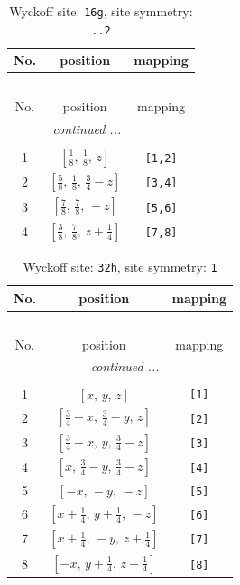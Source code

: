 \documentclass[fleqn,8pt]{jsarticle}
\begin{document}
\renewcommand{\arraystretch}{1.2}
\begin{longtable}{ccc}
\caption{Wyckoff site: {\tt 16g}, site symmetry: {\tt ..2}}
 \\
 \hline \hline
No. & position & mapping \\ \hline \endfirsthead

\multicolumn{2}{l}{\tablename\ \thetable{}} \\
 \hline \hline
No. & position & mapping \\ \hline \endhead

 \hline \hline
\multicolumn{2}{r}{\footnotesize\it continued ...} \\ \endfoot

 \hline \hline
\multicolumn{2}{r}{} \\ \endlastfoot

1 & $\left[ \frac{1}{8},\, \frac{1}{8},\, z \right]$ & {\tt [1,2]} \\ \hline
2 & $\left[ \frac{5}{8},\, \frac{1}{8},\, \frac{3}{4} - z \right]$ & {\tt [3,4]} \\ \hline
3 & $\left[ \frac{7}{8},\, \frac{7}{8},\, - z \right]$ & {\tt [5,6]} \\ \hline
4 & $\left[ \frac{3}{8},\, \frac{7}{8},\, z + \frac{1}{4} \right]$ & {\tt [7,8]} \\
\end{longtable}
\renewcommand{\arraystretch}{1.2}
\begin{longtable}{ccc}
\caption{Wyckoff site: {\tt 32h}, site symmetry: {\tt 1}}
 \\
 \hline \hline
No. & position & mapping \\ \hline \endfirsthead

\multicolumn{2}{l}{\tablename\ \thetable{}} \\
 \hline \hline
No. & position & mapping \\ \hline \endhead

 \hline \hline
\multicolumn{2}{r}{\footnotesize\it continued ...} \\ \endfoot

 \hline \hline
\multicolumn{2}{r}{} \\ \endlastfoot

1 & $\left[ x,\, y,\, z \right]$ & {\tt [1]} \\ \hline
2 & $\left[ \frac{3}{4} - x,\, \frac{3}{4} - y,\, z \right]$ & {\tt [2]} \\ \hline
3 & $\left[ \frac{3}{4} - x,\, y,\, \frac{3}{4} - z \right]$ & {\tt [3]} \\ \hline
4 & $\left[ x,\, \frac{3}{4} - y,\, \frac{3}{4} - z \right]$ & {\tt [4]} \\ \hline
5 & $\left[ - x,\, - y,\, - z \right]$ & {\tt [5]} \\ \hline
6 & $\left[ x + \frac{1}{4},\, y + \frac{1}{4},\, - z \right]$ & {\tt [6]} \\ \hline
7 & $\left[ x + \frac{1}{4},\, - y,\, z + \frac{1}{4} \right]$ & {\tt [7]} \\ \hline
8 & $\left[ - x,\, y + \frac{1}{4},\, z + \frac{1}{4} \right]$ & {\tt [8]} \\
\end{longtable}
\end{document}
